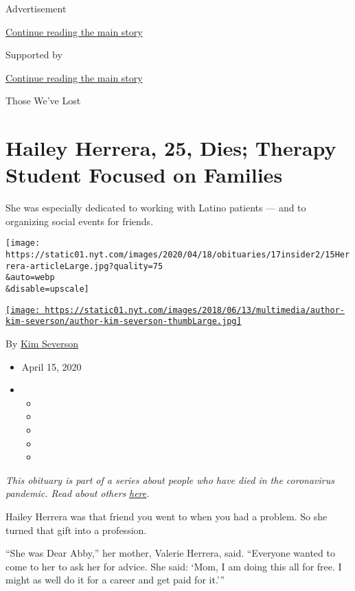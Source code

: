 Advertisement

\protect\hyperlink{after-top}{Continue reading the main story}

Supported by

\protect\hyperlink{after-sponsor}{Continue reading the main story}

Those We've Lost

\hypertarget{hailey-herrera-25-dies-therapy-student-focused-on-families}{%
\section{Hailey Herrera, 25, Dies; Therapy Student Focused on
Families}\label{hailey-herrera-25-dies-therapy-student-focused-on-families}}

She was especially dedicated to working with Latino patients --- and to
organizing social events for friends.

\texttt{[image: https://static01.nyt.com/images/2020/04/18/obituaries/17insider2/15Herrera-articleLarge.jpg?quality=75\\\&auto=webp\\\&disable=upscale]}

\href{https://www.nytimes.com/by/kim-severson}{\texttt{[image: https://static01.nyt.com/images/2018/06/13/multimedia/author-kim-severson/author-kim-severson-thumbLarge.jpg]}}

By \href{https://www.nytimes.com/by/kim-severson}{Kim Severson}

\begin{itemize}
\item
  April 15, 2020
\item
  \begin{itemize}
  \item
  \item
  \item
  \item
  \item
  \end{itemize}
\end{itemize}

\emph{This obituary is part of a series about people who have died in
the coronavirus pandemic. Read about others}
\href{https://www.nytimes.com/series/people-who-have-died-of-the-coronavirus}{\emph{here}}\emph{.}

Hailey Herrera was that friend you went to when you had a problem. So
she turned that gift into a profession.

``She was Dear Abby,'' her mother, Valerie Herrera, said. ``Everyone
wanted to come to her to ask her for advice. She said: `Mom, I am doing
this all for free. I might as well do it for a career and get paid for
it.'''

